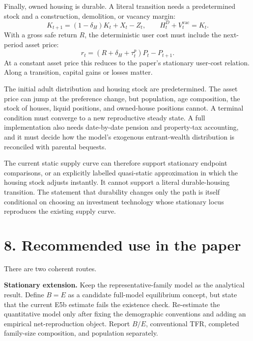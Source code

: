 \documentclass[11pt]{article}
\begin{document}
Finally, owned housing is durable.  A literal transition needs a predetermined
stock and a construction, demolition, or vacancy margin:
\begin{equation}
 K_{t+1}=(1-\delta_H)K_t+X_t-Z_t,
 \qquad
 H_t^D+V_t^{\mathrm{vac}}=K_t.
 \label{eq:housing_stock}
\end{equation}
With a gross safe return $R$, the deterministic user cost must include the
next-period asset price:
\begin{equation}
 r_t=(R+\delta_H+\tau_t^p)P_t-P_{t+1}.
 \label{eq:dynamic_user_cost}
\end{equation}
At a constant asset price this reduces to the paper's stationary user-cost
relation.  Along a transition, capital gains or losses matter.

The initial adult distribution and housing stock are predetermined.  The
asset price can jump at the preference change, but population, age composition,
the stock of houses, liquid positions, and owned-house positions cannot.  A
terminal condition must converge to a new reproductive steady state.  A full
implementation also needs date-by-date pension and property-tax accounting,
and it must decide how the model's exogenous entrant-wealth distribution is
reconciled with parental bequests.

The current static supply curve can therefore support stationary endpoint
comparisons, or an explicitly labelled quasi-static approximation in which the
housing stock adjusts instantly.  It cannot support a literal durable-housing
transition.  The statement that durability changes only the path is itself
conditional on choosing an investment technology whose stationary locus
reproduces the existing supply curve.

\section*{8. Recommended use in the paper}

There are two coherent routes.

\textbf{Stationary extension.}  Keep the representative-family model as the
analytical result.  Define $B=E$ as a candidate full-model equilibrium concept,
but state that the current E5b estimate fails the existence check.  Re-estimate
the quantitative model only after fixing the demographic conventions and adding
an empirical net-reproduction object.  Report $B/E$, conventional TFR, completed
family-size composition, and population separately.
\end{document}
